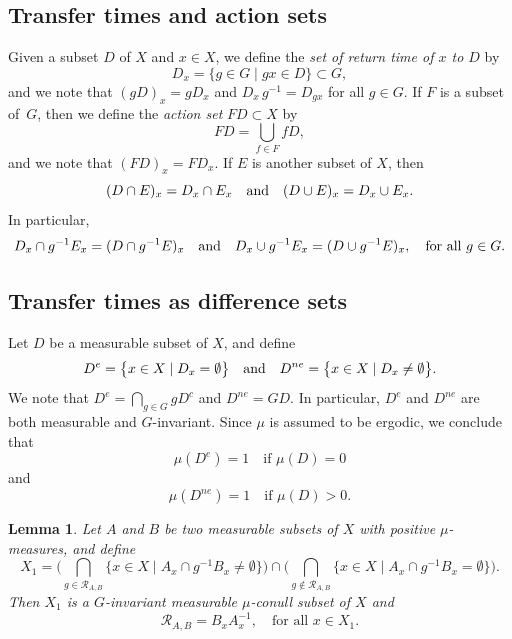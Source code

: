 \documentclass[10pt]{amsart}
\let\mathcal\mathscr
\newcommand{\cR}{\mathcal{R}}
\newcommand{\qand}{\quad\textup{and}\quad}
\theoremstyle{plain}
\newtheorem{lemma}[theorem]{Lemma}
\theoremstyle{definition}
\begin{document}
\subsection{Transfer times and action sets}
\label{subsec:deftransfer}
Given a subset $D$ of $X$ and $x \in X$, we define the \emph{set of return time of $x$ to $D$} by
\[
D_x = \bigl\{ g \in G \mid  gx \in D \bigr\} \subset G,
\]
and we note that $(gD)_x = gD_x$ and $D_x \, g^{-1} = D_{gx}$ for all $g \in G$.
If $F$ is a subset of~$G$, then we define the \emph{action set} $FD \subset X$ by
\[
FD = \bigcup_{f \in F} fD,
\]
and we note that $(FD)_x = F D_x$. If $E$ is another subset of $X$, then
\[
(D \cap E)_x = D_x \cap E_x \qand (D \cup E)_x = D_x \cup E_x.
\]
In particular,
\begin{equation}
\label{eq_DcapE}
D_x \cap g^{-1} E_x = (D \cap g^{-1} E)_x \qand D_x \cup g^{-1} E_x = (D \cup g^{-1} E)_x, \quad \textrm{for all $g \in G$}.
\end{equation}

\subsection{Transfer times as difference sets}

Let $D$ be a measurable subset of $X$, and define
\[
D^{e} = \bigl\{ x \in X \mid  D_x = \emptyset \bigr\}
\qand
D^{ne} = \bigl\{ x \in X \mid  D_x \neq \emptyset \bigr\}.
\]
We note that $D^{e} = \bigcap_{g \in G} gD^c$ and $D^{ne} = GD$. In particular, $D^e$ and $D^{ne}$ are both measurable and $G$-invariant.
Since $\mu$ is assumed to be ergodic, we conclude that
\begin{equation}
\label{De}
\mu(D^e) = 1 \quad \textrm{if $\mu(D) = 0$}
\end{equation}
and
\begin{equation}
\label{Dne}
\mu(D^{ne}) = 1 \quad \textrm{if $\mu(D) > 0$}.
\end{equation}

\begin{lemma}
\label{lemma_passtoreturns}
Let $A$ and $B$ be two measurable subsets of $X$ with positive $\mu$-measures, and define
\[
X_1 = \Big( \bigcap_{g \in \cR_{A,B}} \bigl\{ x \in X \mid  A_x \cap g^{-1}B_x \neq \emptyset \bigr\} \Big)
\cap
\Big( \bigcap_{g \notin \cR_{A,B}} \bigl\{ x \in X \mid  A_x \cap g^{-1} B_x = \emptyset \bigr\} \Big).
\]
Then $X_1$ is a $G$-invariant measurable $\mu$-conull subset of $X$ and
\[
\cR_{A,B} = B_x A_x^{-1}, \quad \textrm{for all $x \in X_1$}.
\]
\end{lemma}
\end{document}
